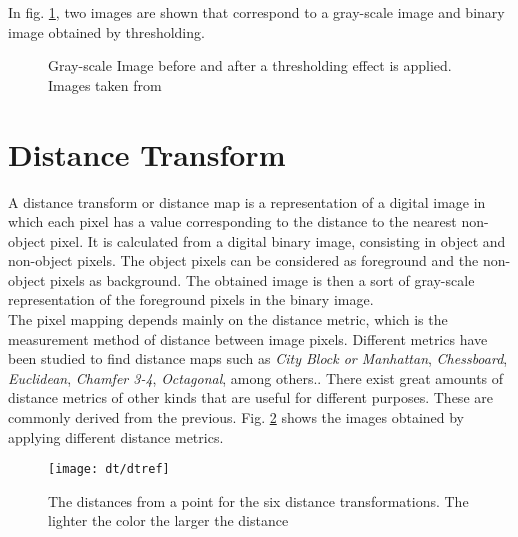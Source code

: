 In fig. \ref{fig:thres1}, two images are shown that correspond to a gray-scale image
and binary image obtained by thresholding.

\begin{figure}[h t b p ! H]
  \centering
\qquad
  \caption[Gray-scale Image before and after a thresholding effect is applied]{Gray-scale Image before and after a thresholding effect is applied. Images taken from \cite{web:thresholding}}
  \label{fig:thres1}
\end{figure}

\section{Distance Transform}
\label{sec:dt}

A distance transform or distance map is a representation of a digital image
in which each pixel has a value corresponding to the distance to the 
nearest non-object pixel. It is calculated from a digital binary image, 
consisting in object and non-object pixels. The object 
pixels can be considered as foreground and the non-object pixels as
background. The obtained image is then a sort of gray-scale representation
of the foreground pixels in the binary image.\\
The pixel mapping depends mainly on the distance metric, which is the 
measurement method of distance between image pixels. Different metrics have been 
studied to find distance maps such as 
\emph{City Block or Manhattan},
\emph{Chessboard}, \emph{Euclidean}, \emph{Chamfer 3-4}, \emph{Octagonal}, among
others.\cite[p.363]{dtresearch}. There exist great amounts of
distance metrics of other kinds that are useful for different purposes.
These are commonly derived from the previous.
Fig. \ref{fig:dtexamples} shows the images obtained by applying different distance metrics.

\begin{figure}[h t b p ! H]
 \centering
   \texttt{[image: dt/dtref]}
 \caption[The distances from a point for the six distance transformations]{The distances from a point for the six distance transformations.
 The lighter the color the larger the distance \cite[p.365]{dtresearch}}
 \label{fig:dtexamples}
\end{figure}

